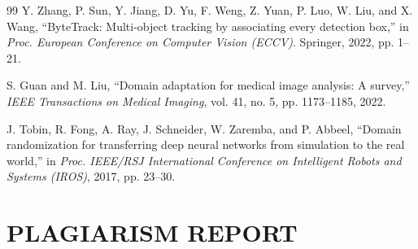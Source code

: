 \documentclass[12pt,a4paper]{report}
\begin{document}
\begin{thebibliography}{99}
 Y. Zhang, P. Sun, Y. Jiang, D. Yu, F. Weng, Z. Yuan, P. Luo, W. Liu, and X. Wang, ``ByteTrack: Multi-object tracking by associating every detection box,'' in \textit{Proc. European Conference on Computer Vision (ECCV)}. Springer, 2022, pp. 1--21.

 S. Guan and M. Liu, ``Domain adaptation for medical image analysis: A survey,'' \textit{IEEE Transactions on Medical Imaging}, vol. 41, no. 5, pp. 1173--1185, 2022.

 J. Tobin, R. Fong, A. Ray, J. Schneider, W. Zaremba, and P. Abbeel, ``Domain randomization for transferring deep neural networks from simulation to the real world,'' in \textit{Proc. IEEE/RSJ International Conference on Intelligent Robots and Systems (IROS)}, 2017, pp. 23--30.

\end{thebibliography}

\newpage
\chapter{PLAGIARISM REPORT}
\end{document}
